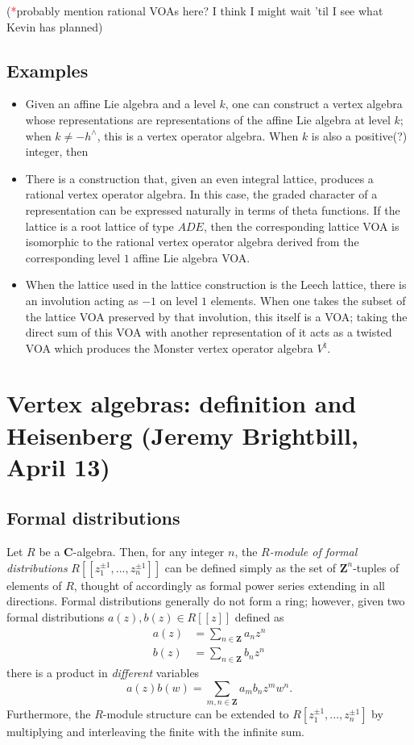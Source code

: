 \documentclass{article}
\newcommand{\CC}{\mathbold{C}}
\newcommand{\ZZ}{\mathbold{Z}}
\newcommand{\tk}{\textcolor{red}{*}}
\begin{document}
(\tk probably mention rational VOAs here?  I think I might wait 'til I see what Kevin has planned)

\subsection{Examples}
\begin{itemize}
\item Given an affine Lie algebra and a level $k$, one can construct a vertex algebra whose representations are representations of the affine Lie algebra at level $k$; when $k \ne - h^\wedge$, this is a vertex operator algebra.  When $k$ is also a positive(?) integer, then 
\item There is a construction that, given an even integral lattice, produces a rational vertex operator algebra.  In this case, the graded character of a representation can be expressed naturally in terms of theta functions.  If the lattice is a root lattice of type $ADE$, then the corresponding lattice VOA is isomorphic to the rational vertex operator algebra derived from the corresponding level $1$ affine Lie algebra VOA.
\item When the lattice used in the lattice construction is the Leech lattice, there is an involution acting as $-1$ on level $1$ elements.  When one takes the subset of the lattice VOA preserved by that involution, this itself is a VOA; taking the direct sum of this VOA with another representation of it acts as a twisted VOA which produces the Monster vertex operator algebra $V^\natural$.
\end{itemize}

\section{Vertex algebras: definition and Heisenberg (Jeremy Brightbill, April 13)}
\label{sec:defheis}

\subsection{Formal distributions}
Let $R$ be a $\CC$-algebra.  Then, for any integer $n$, the \textit{$R$-module of formal distributions} $R[[z_1^{\pm 1},...,z_n^{\pm 1}]]$ can be defined simply as the set of $\ZZ^n$-tuples of elements of $R$, thought of accordingly as formal power series extending in all directions.  Formal distributions generally do not form a ring; however, given two formal distributions $a(z),b(z) \in R[[z]]$ defined as
\begin{align*}
  a(z)&=\sum_{n \in \ZZ}a_nz^n\\
  b(z)&=\sum_{n \in \ZZ}b_nz^n
\end{align*}
there is a product in \textit{different} variables
\[a(z)b(w) = \sum_{m,n \in \ZZ}a_mb_nz^mw^n. \]
Furthermore, the $R$-module structure can be extended to $R[z_1^{\pm 1},...,z_n^{\pm 1}]$ by multiplying and interleaving the finite with the infinite sum.
\end{document}

